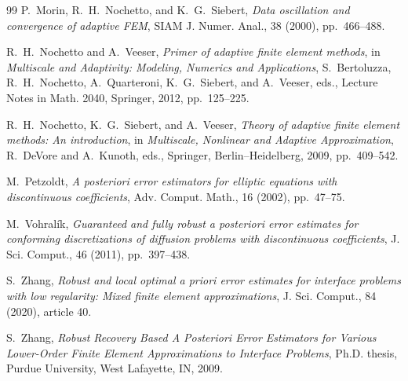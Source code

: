 \documentclass[10pt,pdftex]{amsart}%
\numberwithin{equation}{section}
\begin{document}
\begin{thebibliography}{99}
P.~Morin, R.~H.~Nochetto, and K.~G.~Siebert,
\newblock \emph{Data oscillation and convergence of adaptive FEM},
\newblock SIAM J. Numer. Anal., 38 (2000), pp.~466--488.

R.~H.~Nochetto and A.~Veeser,
\newblock \emph{Primer of adaptive finite element methods},
\newblock in \emph{Multiscale and Adaptivity: Modeling, Numerics and Applications},
S.~Bertoluzza, R.~H.~Nochetto, A.~Quarteroni, K.~G.~Siebert, and A.~Veeser, eds.,
Lecture Notes in Math. 2040, Springer, 2012, pp.~125--225.

R.~H.~Nochetto, K.~G.~Siebert, and A.~Veeser,
\newblock \emph{Theory of adaptive finite element methods: An introduction},
\newblock in \emph{Multiscale, Nonlinear and Adaptive Approximation},
R.~DeVore and A.~Kunoth, eds., Springer, Berlin--Heidelberg, 2009,
pp.~409--542.

M.~Petzoldt,
\newblock \emph{A posteriori error estimators for elliptic equations with discontinuous coefficients},
\newblock Adv. Comput. Math., 16 (2002), pp.~47--75.

M.~Vohral\'ik,
\newblock \emph{Guaranteed and fully robust a posteriori error estimates for conforming discretizations of diffusion problems with discontinuous coefficients},
\newblock J. Sci. Comput., 46 (2011), pp.~397--438.

S.~Zhang,
\newblock \emph{Robust and local optimal a priori error estimates for interface problems with low regularity: Mixed finite element approximations},
\newblock J. Sci. Comput., 84 (2020), article 40.

S.~Zhang,
\newblock \emph{Robust Recovery Based A Posteriori Error Estimators for Various Lower-Order Finite Element Approximations to Interface Problems},
\newblock Ph.D. thesis, Purdue University, West Lafayette, IN, 2009.

\end{thebibliography}
\end{document}
